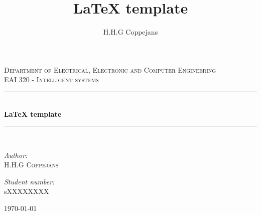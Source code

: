 \documentclass[a4paper,12pt]{report}
\author{H.H.G Coppejans}
\title{ LaTeX template}
\newcommand{\HRule}{\rule{\linewidth}{0.5mm}}
\begin{document}
\setlength{\parskip}{6pt}
\begin{titlepage}

\begin{center}
\textsc{\LARGE Department of Electrical, Electronic and Computer Engineering}\\[1.5cm]
\textsc{\Large EAI 320 - Intelligent systems}\\[0.5cm]
\HRule \\[0.4cm]
{ \huge \bfseries LaTeX template}\\[0.4cm]
\HRule \\[0.4cm]
\begin{minipage}{0.4\textwidth}
\begin{flushleft} \large
\emph{Author:}\\
H.H.G \textsc{Coppejans}
\end{flushleft}
\end{minipage}
\begin{minipage}{0.4\textwidth}
\begin{flushright} \large
\emph{Student number:} \\
sXXXXXXXX
\end{flushright}
\end{minipage}
\vfill
{\large \today}
\end{center}
\end{titlepage}
%
\setcounter{chapter}{1}
\renewcommand{\thesection}{\arabic{section}}
\end{document}

